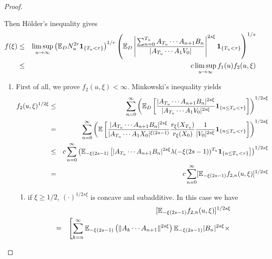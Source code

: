 \documentclass{article}
\begin{document}
\begin{proof}
\begin{enumerate}
    Then H\"older's
    inequality gives
    \begin{eqnarray*}
      f(\xi) &\leq& \limsup_{u \to \infty}
      \left(\mathbb{E}_D N_u^{2r} \mathbf{1}_{\{T_u < \tau\}}\right)^{1/r}
      \left(\mathbb{E}_D \left|
          \frac{
            \sum_{n=0}^{T_u} A_{T_u} \cdots A_{n+1} B_n 
          }{
            |A_{T_u} \cdots A_1 V_0|
          }
        \right|^{2 s \xi} \mathbf{1}_{\{T_u < \tau\}}
      \right)^{1/s} \\
      &\leq& c \limsup_{u \to \infty} f_1(u) f_2(u, \xi)
    \end{eqnarray*}
    \begin{enumerate}
    \item First of all, we prove $f_2(u,\xi) < \infty$. Minkowski's
      inequality yields
      \begin{eqnarray*}
        f_2(u, \xi)^{1/2\xi} &\leq& \sum_{n=0}^\infty \left(\mathbb{E}_D \left[
            \frac{
              |A_{T_u} \cdots A_{n+1} B_n |^{2s\xi}
            }{
              |A_{T_u} \cdots A_1 V_0|^{2s\xi}
            } \mathbf{1}_{\{n \leq T_u < \tau\}}
          \right]\right)^{1/2s\xi} \\
        &=& \sum_{n=0}^\infty \left(\mathbb{E} \left[
            \frac{
              |A_{T_u} \cdots A_{n+1} B_n |^{2s\xi}
            }{
              |A_{T_u} \cdots A_1 X_0|^{\xi(2s - 1)}
            }
            \frac{
              r_{\xi}(X_{T_u})
            }{
              r_{\xi}(X_{0})
            }
            {1 \over |V_0|^{2s\xi}}\mathbf{1}_{\{n \leq T_u < \tau\}}
          \right]\right)^{1/2s\xi} \\
        &\leq& c \sum_{n=0}^\infty
        \left(\mathbb{E}_{-\xi(2s - 1)} \left[
            |A_{T_u} \cdots A_{n+1} B_n |^{2s\xi}
            \lambda(-\xi(2s - 1))^{T_u}
            \mathbf{1}_{\{n \leq T_u < \tau\}}
          \right]\right)^{1/2s\xi} \\
        &=& c \sum_{n=0}^\infty [\mathbb{E}_{-\xi(2s - 1)}
        f_{2,n}(u,\xi)]^{1/2s\xi}
      \end{eqnarray*}
      \begin{enumerate}
      \item if $\xi \geq 1/2$, $(\cdot)^{1/2s\xi}$ is concave
        and subadditive. In this case we have
        \begin{eqnarray*}
          && [\E_{-\xi(2s - 1)} f_{2,n}(u,\xi)]^{1/2s\xi} \\
          &=& \left[
              \sum_{k=n}^\infty
              \E_{-\xi(2s - 1)}\left(
              \|A_k \cdots A_{n+1}\|^{2s\xi}
              \right)
              \E_{-\xi(2s - 1)} |B_n|^{2s\xi} \times \right.\\

\end{eqnarray*}
\end{enumerate}
\end{enumerate}
\end{enumerate}
\end{proof}
\end{document}
